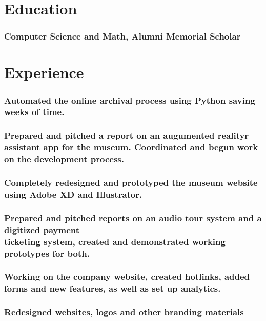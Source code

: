 \documentclass[a4paper]{resume}
\begin{document}
\section{Education}
\subsubsection{Computer Science and Math, Alumni Memorial Scholar}

\section{Experience}
\subsubsection{Automated the online archival process using Python saving weeks of time.}
\subsubsection{Prepared and pitched a report on an augumented realityr assistant app for the museum. Coordinated and begun work on the development process.}
\subsubsection{Completely redesigned and prototyped the museum website using Adobe XD and Illustrator.}
\subsubsection{Prepared and pitched reports on an audio tour system and a digitized payment\\ticketing system, created and demonstrated working prototypes for both.}

\subsubsection{Working on the company website, created hotlinks, added forms and new features, as well as set up analytics.}

\subsubsection{Redesigned websites, logos and other branding materials}
\end{document}
